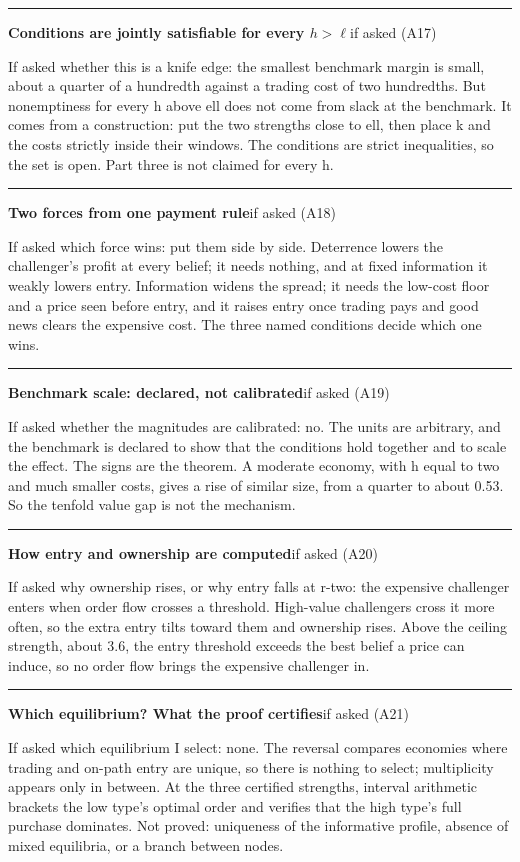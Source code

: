\documentclass[11pt]{article}
\newcommand{\scriptframe}[3]{%
  \Needspace{9\baselineskip}%
  \par\medskip\noindent\textcolor{ScriptBlue}{\rule{\linewidth}{0.55pt}}%
  \par\smallskip\noindent
  \textbf{#1}\hfill\textcolor{ScriptGray}{\small #2}\par\smallskip
  #3\par}
\begin{document}
\scriptframe{Conditions are jointly satisfiable for every $h>\ell$}{if asked (A17)}{%
  If asked whether this is a knife edge: the smallest benchmark margin is small,
  about a quarter of a hundredth against a trading cost of two hundredths.
  But nonemptiness for every h above ell does not come from slack at the
  benchmark. It comes from a construction: put the two strengths close to ell,
  then place k and the costs strictly inside their windows. The conditions are
  strict inequalities, so the set is open. Part three is not claimed for every h.
}

\scriptframe{Two forces from one payment rule}{if asked (A18)}{%
  If asked which force wins: put them side by side. Deterrence lowers the
  challenger's profit at every belief; it needs nothing, and at fixed
  information it weakly lowers entry. Information widens the spread; it needs
  the low-cost floor and a price seen before entry, and it raises entry once
  trading pays and good news clears the expensive cost. The three named
  conditions decide which one wins.
}

\scriptframe{Benchmark scale: declared, not calibrated}{if asked (A19)}{%
  If asked whether the magnitudes are calibrated: no. The units are arbitrary,
  and the benchmark is declared to show that the conditions hold together and to
  scale the effect. The signs are the theorem. A moderate economy, with h equal
  to two and much smaller costs, gives a rise of similar size, from a quarter to
  about 0.53. So the tenfold value gap is not the mechanism.
}

\scriptframe{How entry and ownership are computed}{if asked (A20)}{%
  If asked why ownership rises, or why entry falls at r-two: the expensive
  challenger enters when order flow crosses a threshold. High-value challengers
  cross it more often, so the extra entry tilts toward them and ownership rises.
  Above the ceiling strength, about 3.6, the entry threshold exceeds the best
  belief a price can induce, so no order flow brings the expensive challenger
  in.
}

\scriptframe{Which equilibrium? What the proof certifies}{if asked (A21)}{%
  If asked which equilibrium I select: none. The reversal compares economies
  where trading and on-path entry are unique, so there is nothing to select;
  multiplicity appears only in between. At the three certified strengths,
  interval arithmetic brackets the low type's optimal order and verifies that
  the high type's full purchase dominates. Not proved: uniqueness of the
  informative profile, absence of mixed equilibria, or a branch between nodes.
}
\end{document}
